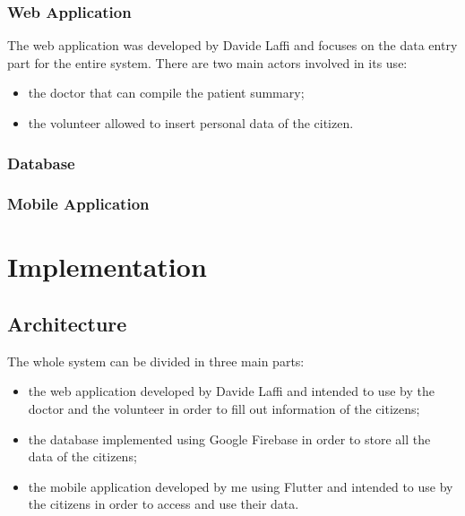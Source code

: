 \documentclass[oneside]{book}
\begin{document}
\subsection{Web Application}
The web application was developed by Davide Laffi and focuses on the data entry part for the entire system. There are two main actors involved in its use:
\begin{itemize}
\item the doctor that can compile the patient summary;
\item the volunteer allowed to insert personal data of the citizen.
\end{itemize}

\subsection{Database}

\subsection{Mobile Application}


\chapter{Implementation}
\section{Architecture}
The whole system can be divided in three main parts:
\begin{itemize}
\item the web application developed by Davide Laffi and intended to use by the doctor and the volunteer in order to fill out information of the citizens;
\item the database implemented using Google Firebase in order to store all the data of the citizens;
\item the mobile application developed by me using Flutter and intended to use by the citizens in order to access and use their data.
\end{itemize}
\end{document}
